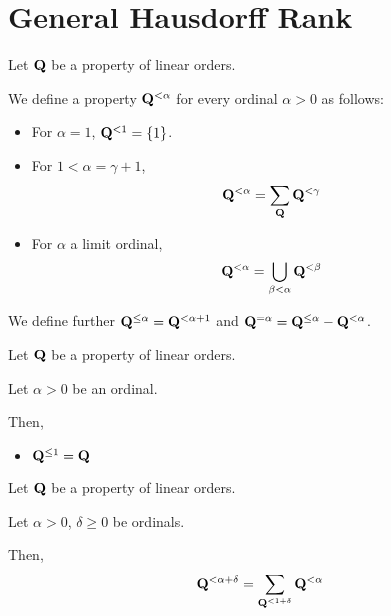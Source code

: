 
\section{General Hausdorff Rank}

\begin{definition}
  Let $\mathbf{Q}$ be a property of linear orders.

  We define a property $\mathbf{Q}^{< \alpha}$
  for every ordinal $\alpha > 0$ as follows:

  \begin{itemize}
    \item For $\alpha = 1$, $\mathbf{Q}^{< 1} = \left\{ {1} \right\}$.
    \item For $1 < \alpha = \gamma + 1$,
          \[\mathbf{Q}^{< \alpha} = \sum_{\mathbf{Q}}{\mathbf{Q}^{< \gamma}}\]
    \item For $\alpha$ a limit ordinal,
          \[\mathbf{Q}^{< \alpha} = \bigcup_{\beta < \alpha} \mathbf{Q}^{< \beta}\]
  \end{itemize}

  We define further $\mathbf{Q}^{\le \alpha} = \mathbf{Q}^{< \alpha + 1}$
  and $\mathbf{Q}^{= \alpha} = \mathbf{Q}^{\le \alpha} - \mathbf{Q}^{< \alpha}$.
\end{definition}

\begin{observations}
  Let $\mathbf{Q}$ be a property of linear orders.

  Let $\alpha > 0$ be an ordinal.

  Then,
  \begin{itemize}
    \item $\mathbf{Q}^{\le 1} = \mathbf{Q}$
  \end{itemize}
\end{observations}

\begin{lemma}
  Let $\mathbf{Q}$ be a property of linear orders.

  Let $\alpha > 0$, $\delta \ge 0$ be ordinals.

  Then,
  \[
    \mathbf{Q}^{< \alpha + \delta}
    = \sum_{\mathbf{Q}^{< 1 + \delta}}{\mathbf{Q}^{< \alpha}}
  \]
\end{lemma}

